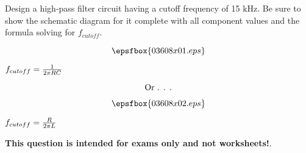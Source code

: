 

Design a high-pass filter circuit having a cutoff frequency of 15 kHz.  Be sure to show the schematic diagram for it complete with all component values and the formula solving for $f_{cutoff}$.

\vskip 50pt







$$\epsfbox{03608x01.eps}$$

$f_{cutoff} = {1 \over {2 \pi RC}}$

\vskip 10pt

$$\hbox{Or . . .}$$

$$\epsfbox{03608x02.eps}$$

$f_{cutoff} = {R \over {2 \pi L}}$







{\bf This question is intended for exams only and not worksheets!}.



